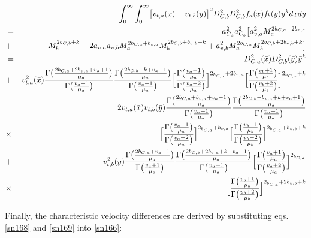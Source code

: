 \begin{eqnarray}
& &\int_{0}^{\infty}\int_{0}^{\infty}\bigl[v_{t,a}(x)-v_{t,b}(y)\bigr]^{2}D_{C,b}^{2}D_{C,b}^{2}f_{a}(x)f_{b}(y)y^{k}dxdy\nonumber\\
&=&a_{C_{a}}^{2}a_{C_{b}}^{2}\bigl[a_{v,a}^{2}M_{a}^{2b_{C,a}+2b_{v,a}}\nonumber\\
&+&M_{b}^{2b_{C,b}+k}-2a_{v,a}a_{v,b}M_{a}^{2b_{C,a}+b_{v,a}}M_{b}^{2b_{C,b}+b_{v,b}+k}+a_{v,b}^{2}M_{a}^{2b_{C,a}}M_{b}^{2b_{C,b}+2b_{v,b}+k}\bigr]\nonumber\\
&=&D_{C,a}^{2}(\bar{x})D_{C,b}^{2}(\bar{y})\bar{y}^{k}\nonumber\\
&+&v_{t,a}^{2}(\bar{x})
\frac{\Gamma\bigl(\frac{2b_{C,a}+2b_{v,a}+v_{a}+1}{\mu_{a}}\bigr)}{\Gamma\bigl(\frac{v_{a}+1}{\mu_{a}}\bigr)}
\frac{\Gamma\bigl(\frac{2b_{C,b}+k+v_{a}+1}{\mu_{a}}\bigr)}{\Gamma\bigl(\frac{v_{a}+1}{\mu_{a}}\bigr)}
\Bigl[\frac{\Gamma\bigl(\frac{v_{a}+1}{\mu_{a}}\bigr)}{\Gamma\bigl(\frac{v_{a}+2}{\mu_{a}}\bigr)}\Bigr]^{2_{b_{C,a}}+2b_{v,a}}
\Bigl[\frac{\Gamma\bigl(\frac{v_{b}+1}{\mu_{b}}\bigr)}{\Gamma\bigl(\frac{v_{b}+2}{\mu_{b}}\bigr)}\Bigr]^{2_{b_{C,a}}+k}\nonumber\\
&=&2v_{t,a}(\bar{x})v_{t,b}(\bar{y})
\frac{\Gamma\bigl(\frac{2b_{C,a}+b_{v,a}+v_{a}+1}{\mu_{a}}\bigr)}{\Gamma\bigl(\frac{v_{a}+1}{\mu_{a}}\bigr)}
\frac{\Gamma\bigl(\frac{2b_{C,b}+b_{v,a}+k+v_{a}+1}{\mu_{a}}\bigr)}{\Gamma\bigl(\frac{v_{a}+1}{\mu_{a}}\bigr)}\nonumber\\
&\times&\Bigl[\frac{\Gamma\bigl(\frac{v_{a}+1}{\mu_{a}}\bigr)}{\Gamma\bigl(\frac{v_{a}+2}{\mu_{a}}\bigr)}\Bigr]^{2_{b_{C,a}}+b_{v,a}}
\Bigl[\frac{\Gamma\bigl(\frac{v_{b}+1}{\mu_{b}}\bigr)}{\Gamma\bigl(\frac{v_{b}+2}{\mu_{b}}\bigr)}\Bigr]^{2_{b_{C,a}}+b_{v,b}+k}\nonumber\\
&+&v_{t,b}^{2}(\bar{y})
\frac{\Gamma\bigl(\frac{2b_{C,a}+v_{a}+1}{\mu_{a}}\bigr)}{\Gamma\bigl(\frac{v_{a}+1}{\mu_{a}}\bigr)}
\frac{\Gamma\bigl(\frac{2b_{C,b}+2b_{v,a}+k+v_{a}+1}{\mu_{a}}\bigr)}{\Gamma\bigl(\frac{v_{a}+1}{\mu_{a}}\bigr)}
\Bigl[\frac{\Gamma\bigl(\frac{v_{a}+1}{\mu_{a}}\bigr)}{\Gamma\bigl(\frac{v_{a}+2}{\mu_{a}}\bigr)}\Bigr]^{2_{b_{C,a}}}\nonumber\\
&\times&\Bigl[\frac{\Gamma\bigl(\frac{v_{b}+1}{\mu_{b}}\bigr)}{\Gamma\bigl(\frac{v_{b}+2}{\mu_{b}}\bigr)}\Bigr]^{2_{b_{C,a}}+2b_{v,b}+k}\label{sn169}
\end{eqnarray}

Finally, the characteristic velocity differences are derived by substituting eqs.\ref{sn168} and \ref{sn169} into \ref{sn166}:

